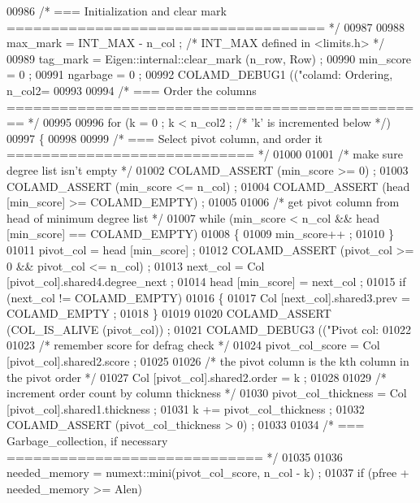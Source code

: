 \begin{DoxyCode}
{{{{{{{{{{{{{{{{{00986   \textcolor{comment}{/* === Initialization and clear mark ==================================== */}
00987 
00988   max\_mark = INT\_MAX - n\_col ;  \textcolor{comment}{/* INT\_MAX defined in <limits.h> */}
00989   tag\_mark = Eigen::internal::clear\_mark (n\_row, Row) ;
00990   min\_score = 0 ;
00991   ngarbage = 0 ;
00992   COLAMD\_DEBUG1 ((\textcolor{stringliteral}{"colamd: Ordering, n\_col2=%
00993 
00994   \textcolor{comment}{/* === Order the columns ================================================ */}
00995 
00996   \textcolor{keywordflow}{for} (k = 0 ; k < n\_col2 ; \textcolor{comment}{/* 'k' is incremented below */})
00997   \{
00998 
00999     \textcolor{comment}{/* === Select pivot column, and order it ============================ */}
01000 
01001     \textcolor{comment}{/* make sure degree list isn't empty */}
01002     COLAMD\_ASSERT (min\_score >= 0) ;
01003     COLAMD\_ASSERT (min\_score <= n\_col) ;
01004     COLAMD\_ASSERT (head [min\_score] >= COLAMD\_EMPTY) ;
01005 
01006     \textcolor{comment}{/* get pivot column from head of minimum degree list */}
01007     \textcolor{keywordflow}{while} (min\_score < n\_col && head [min\_score] == COLAMD\_EMPTY)
01008     \{
01009       min\_score++ ;
01010     \}
01011     pivot\_col = head [min\_score] ;
01012     COLAMD\_ASSERT (pivot\_col >= 0 && pivot\_col <= n\_col) ;
01013     next\_col = Col [pivot\_col].shared4.degree\_next ;
01014     head [min\_score] = next\_col ;
01015     \textcolor{keywordflow}{if} (next\_col != COLAMD\_EMPTY)
01016     \{
01017       Col [next\_col].shared3.prev = COLAMD\_EMPTY ;
01018     \}
01019 
01020     COLAMD\_ASSERT (COL\_IS\_ALIVE (pivot\_col)) ;
01021     COLAMD\_DEBUG3 ((\textcolor{stringliteral}{"Pivot col: %
01022 
01023     \textcolor{comment}{/* remember score for defrag check */}
01024     pivot\_col\_score = Col [pivot\_col].shared2.score ;
01025 
01026     \textcolor{comment}{/* the pivot column is the kth column in the pivot order */}
01027     Col [pivot\_col].shared2.order = k ;
01028 
01029     \textcolor{comment}{/* increment order count by column thickness */}
01030     pivot\_col\_thickness = Col [pivot\_col].shared1.thickness ;
01031     k += pivot\_col\_thickness ;
01032     COLAMD\_ASSERT (pivot\_col\_thickness > 0) ;
01033 
01034     \textcolor{comment}{/* === Garbage\_collection, if necessary ============================= */}
01035 
01036     needed\_memory = numext::mini(pivot\_col\_score, n\_col - k) ;
01037     \textcolor{keywordflow}{if} (pfree + needed\_memory >= Alen)
}}}}}}}}}}}}}}}}}}}
\end{DoxyCode}

